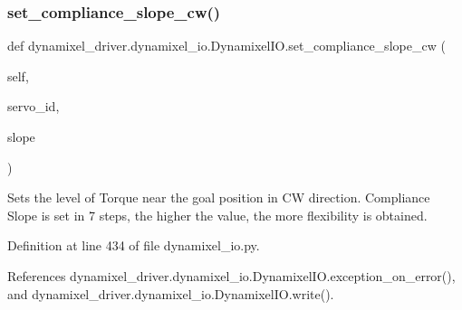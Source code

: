\subsubsection{\texorpdfstring{set\+\_\+compliance\+\_\+slope\+\_\+cw()}{set\_compliance\_slope\_cw()}}
{\footnotesize\ttfamily def dynamixel\+\_\+driver.\+dynamixel\+\_\+io.\+Dynamixel\+I\+O.\+set\+\_\+compliance\+\_\+slope\+\_\+cw (\begin{DoxyParamCaption}\item[{}]{self,  }\item[{}]{servo\+\_\+id,  }\item[{}]{slope }\end{DoxyParamCaption})}

\begin{DoxyVerb}Sets the level of Torque near the goal position in CW direction.
Compliance Slope is set in 7 steps, the higher the value, the more flexibility is obtained.
\end{DoxyVerb}
 

Definition at line 434 of file dynamixel\+\_\+io.\+py.



References dynamixel\+\_\+driver.\+dynamixel\+\_\+io.\+Dynamixel\+I\+O.\+exception\+\_\+on\+\_\+error(), and dynamixel\+\_\+driver.\+dynamixel\+\_\+io.\+Dynamixel\+I\+O.\+write().


